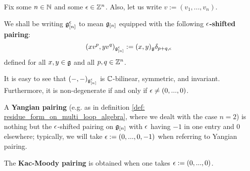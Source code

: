             \begin{definition} \label{def: shifted_pairings}
                Fix some $n \in \mathbb{N}$ and some $\epsilon \in \mathbb{Z}^n$. Also, let us write $v := (v_1, ..., v_n)$.

                We shall be writing $\mathfrak{g}_{[n]}^{\epsilon}$ to mean $\mathfrak{g}_{[n]}$ equipped with the following \textbf{$\epsilon$-shifted pairing}:
                    $$(x v^p, y v^q)_{\mathfrak{g}_{[n]}^{\epsilon}} := (x, y)_{\mathfrak{g}} \delta_{p + q, \epsilon}$$
                defined for all $x, y \in \mathfrak{g}$ and all $p, q \in \mathbb{Z}^n$. 
            \end{definition}
            \begin{remark}
                It is easy to see that $(-, -)_{\mathfrak{g}_{[n]}^{\epsilon}}$ is $\mathbb{C}$-bilinear, symmetric, and invariant. Furthermore, it is non-degenerate if and only if $\epsilon \not = (0, ..., 0)$.
            \end{remark}
            \begin{example}
                A \textbf{Yangian pairing} (e.g. as in definition \ref{def: residue_form_on_multi_loop_algebra}, where we dealt with the case $n = 2$) is nothing but the $\epsilon$-shifted pairing on $\mathfrak{g}_{[n]}$ with $\epsilon$ having $-1$ in one entry and $0$ elsewhere; typically, we will take $\epsilon := (0, ..., 0, -1)$ when referring to  Yangian pairing.
            \end{example}
            \begin{example}
                The \textbf{Kac-Moody pairing} is obtained when one takes $\epsilon := (0, ..., 0)$.
            \end{example}
            
